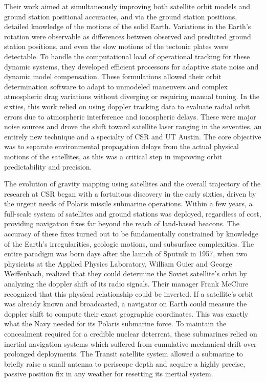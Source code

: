 Their work aimed at simultaneously improving both satellite orbit models and ground station positional accuracies, and via the ground station positions, detailed knowledge of the motions of the solid Earth. Variations in the Earth's rotation were observable as differences between observed and predicted ground station positions, and even the slow motions of the tectonic plates were detectable. To handle the computational load of operational tracking for these dynamic systems, they developed efficient processors for adaptive state noise and dynamic model compensation. These formulations allowed their orbit determination software to adapt to unmodeled maneuvers and complex atmospheric drag variations without diverging or requiring manual tuning. In the sixties, this work relied on using doppler tracking data to evaluate radial orbit errors due to atmospheric interference and ionospheric delays. These were major noise sources and drove the shift toward satellite laser ranging in the seventies, an entirely new technique and a specialty of CSR and UT Austin. The core objective was to separate environmental propagation delays from the actual physical motions of the satellites, as this was a critical step in improving orbit predictability and precision. \cite{schutzPolarMotionResults1979} \cite{eanesCenterSpaceResearch2000}

The evolution of gravity mapping using satellites and the overall trajectory of the research at CSR began with a fortuitous discovery in the early sixties, driven by the urgent needs of Polaris missile submarine operations. Within a few years, a full-scale system of satellites and ground stations was deployed, regardless of cost, providing navigation fixes far beyond the reach of land-based beacons. The accuracy of these fixes turned out to be fundamentally constrained by knowledge of the Earth’s irregularities, geologic motions, and subsurface complexities. The entire paradigm was born days after the launch of Sputnik in 1957, when two physicists at the Applied Physics Laboratory, William Guier and George Weiffenbach, realized that they could determine the Soviet satellite's orbit by analyzing the doppler shift of its radio signals. Their manager Frank McClure recognized that this physical relationship could be inverted. If a satellite's orbit was already known and broadcasted, a navigator on Earth could measure the doppler shift to compute their exact geographic coordinates. This was exactly what the Navy needed for its Polaris submarine force. To maintain the concealment required for a credible nuclear deterrent, these submarines relied on inertial navigation systems which suffered from cumulative mechanical drift over prolonged deployments. The Transit satellite system allowed a submarine to briefly raise a small antenna to periscope depth and acquire a highly precise, passive position fix in any weather for resetting its inertial system. \cite{danchikNavyNavigationSatellite1984}

